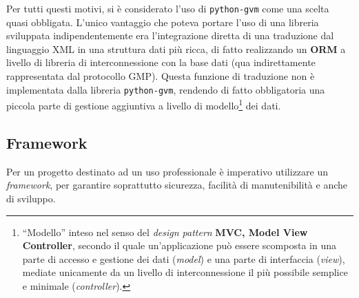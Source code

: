 Per tutti questi motivi, si è considerato l'uso di \texttt{python-gvm} come una scelta quasi obbligata. L'unico vantaggio che poteva portare l'uso di una libreria sviluppata indipendentemente era l'integrazione diretta di una traduzione dal linguaggio XML in una struttura dati più ricca, di fatto realizzando un \textbf{ORM} a livello di libreria di interconnessione con la base dati (qua indirettamente rappresentata dal protocollo GMP). Questa funzione di traduzione non è implementata dalla libreria \texttt{python-gvm}, rendendo di fatto obbligatoria una piccola parte di gestione aggiuntiva a livello di modello\footnote{``Modello'' inteso nel senso del \emph{design pattern} \textbf{MVC, Model View Controller}, secondo il quale un'applicazione può essere scomposta in una parte di accesso e gestione dei dati (\emph{model}) e una parte di interfaccia (\emph{view}), mediate unicamente da un livello di interconnessione il più possibile semplice e minimale (\emph{controller}).} dei dati.

\subsection{Framework}
Per un progetto destinato ad un uso professionale è imperativo utilizzare un \emph{framework}, per garantire soprattutto sicurezza, facilità di manutenibilità e anche di sviluppo.

